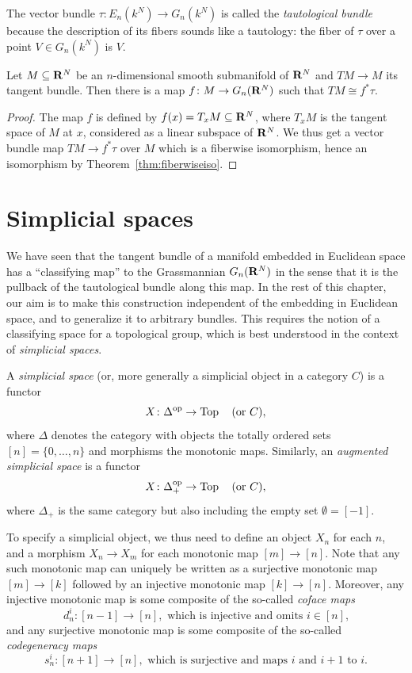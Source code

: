 \documentclass[a4paper,openany]{scrbook}
\begin{document}
The vector bundle $\tau\colon E_n(k^N) \to G_n(k^N)$ is called the \emph{tautological bundle} because the description of its fibers sounds like a tautology: the fiber of $\tau$ over a point $V \in G_n(k^N)$ is $V$.

\begin{thm}
Let $M \subseteq \mathbf R^N$ be an $n$-dimensional smooth submanifold of $\mathbf R^N$ and $TM \to M$ its tangent bundle. Then there is a map $f\colon M \to G_n(\mathbf R^N)$ such that $TM \cong f^*\tau$.
\end{thm}
\begin{proof}
The map $f$ is defined by $f(x) = T_xM \subseteq \mathbf R^N$, where $T_xM$ is the tangent space of $M$ at $x$, considered as a linear subspace of $\mathbf R^N$. We thus get a vector bundle map $TM \to f^*\tau$ over $M$ which is a fiberwise isomorphism, hence an isomorphism by Theorem~\ref{thm:fiberwiseiso}.
\end{proof}

\section{Simplicial spaces}\label{sec:simplicial-spaces}

We have seen that the tangent bundle of a manifold embedded in Euclidean space has a “classifying map” to the Grassmannian $G_n(\mathbf R^N)$ in the sense that it is the pullback of the tautological bundle along this map. In the rest of this chapter, our aim is to make this construction independent of the embedding in Euclidean space, and to generalize it to arbitrary bundles. This requires the notion of a classifying space for a topological group, which is best understood in the context of \emph{simplicial spaces}.

\begin{defn}
A \emph{simplicial space} (or, more generally a simplicial object in a category $C$) is a functor
\[
X\colon \Delta^{\operatorname{op}} \to \operatorname{Top} \quad \text{(or $C$)},
\]
where $\Delta$ denotes the category with objects the totally ordered sets $[n] = \{0,\dots,n\}$ and morphisms the monotonic maps. Similarly, an \emph{augmented simplicial space} is a functor
\[
X\colon \Delta^{\operatorname{op}}_+ \to \operatorname{Top} \quad \text{(or $C$)},
\]
where $\Delta_+$ is the same category but also including the empty set $\emptyset = [-1]$.
\end{defn}

To specify a simplicial object, we thus need to define an object $X_n$ for each $n$, and a morphism $X_n \to X_m$ for each monotonic map $[m] \to [n]$. Note that any such monotonic map can uniquely be written as a surjective monotonic map $[m] \to [k]$ followed by an injective monotonic map $[k] \to [n]$. Moreover, any injective monotonic map is some composite of the so-called \emph{coface maps}
\[
d^i_n\colon [n-1] \to [n], \text{ which is injective and omits $i \in [n]$,}
\]
and any surjective monotonic map is some composite of the so-called \emph{codegeneracy maps}
\[
s^i_n\colon [n+1] \to [n], \text{ which is surjective and maps $i$ and $i+1$ to $i$.}
\]
\end{document}
